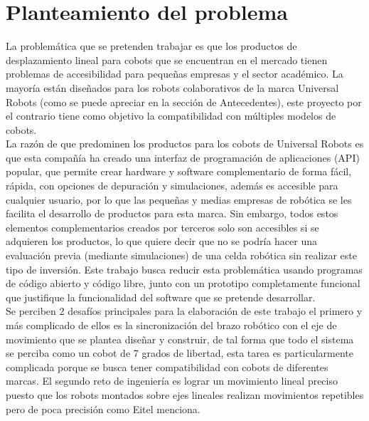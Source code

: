 \section{Planteamiento del problema}

La problemática que se pretenden trabajar es que los productos de desplazamiento lineal para cobots que se encuentran en el mercado tienen problemas de accesibilidad para pequeñas empresas y el sector académico. La mayoría están diseñados para los robots colaborativos de la marca Universal Robots (como se puede apreciar en la sección de Antecedentes), este proyecto por el contrario tiene como objetivo la compatibilidad con múltiples modelos de cobots.\\
La razón de que predominen los productos para los cobots de Universal Robots es que esta compañía ha creado una interfaz de programación de aplicaciones (API) popular, que permite crear hardware y software complementario de forma fácil, rápida, con opciones de depuración y simulaciones, además es accesible para cualquier usuario, por lo que las pequeñas y medias empresas de robótica se les facilita el desarrollo de productos para esta marca. Sin embargo, todos estos elementos complementarios creados por terceros solo son accesibles si se adquieren los productos, lo que quiere decir que no se podría hacer una evaluación previa (mediante simulaciones) de una celda robótica sin realizar este tipo de inversión. Este trabajo busca reducir esta problemática usando programas de código abierto y código libre, junto con un prototipo completamente funcional que justifique la funcionalidad del software que se pretende desarrollar.\\
Se perciben 2 desafíos principales para la elaboración de este trabajo el primero y más complicado de ellos es la sincronización del brazo robótico con el eje de movimiento que se plantea diseñar y construir, de tal forma que todo el sistema se perciba como un cobot de 7 grados de libertad, esta tarea es particularmente complicada porque se busca tener compatibilidad con cobots de diferentes marcas. El segundo reto de ingeniería es lograr un movimiento lineal preciso puesto que los robots montados sobre ejes lineales realizan movimientos repetibles pero de poca precisión como Eitel\cite{Referencia5} menciona.
